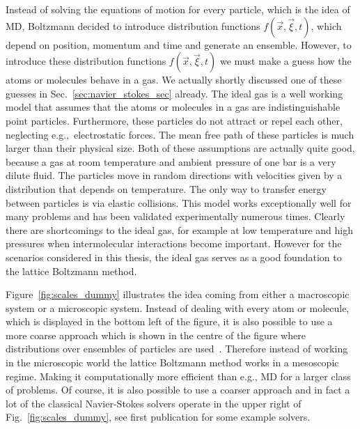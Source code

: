 Instead of solving the equations of motion for every particle, which is the idea of MD, Boltzmann decided to introduce distribution functions $f(\vec{x},\vec{\xi},t)$, which depend on position, momentum and time and generate an ensemble.
However, to introduce these distribution functions $f(\vec{x},\vec{\xi},t)$ we must make a guess how the atoms or molecules behave in a gas.
We actually shortly discussed one of these guesses in Sec.~\ref{sec:navier_stokes_sec} already. 
The ideal gas is a well working model that assumes that the atoms or molecules in a gas are indistinguishable point particles. 
Furthermore, these particles do not attract or repel each other, neglecting e.g.,~electrostatic forces.
The mean free path of these particles is much larger than their physical size.
Both of these assumptions are actually quite good, because a gas at room temperature and ambient pressure of one bar is a very dilute fluid.
The particles move in random directions with velocities given by a distribution that depends on temperature. 
The only way to transfer energy between particles is via elastic collisions.
This model works exceptionally well for many problems and has been validated experimentally numerous times.
Clearly there are shortcomings to the ideal gas, for example at low temperature and high pressures when intermolecular interactions become important.
However for the scenarios considered in this thesis, the ideal gas serves as a good foundation to the lattice Boltzmann method.

Figure~\ref{fig:scales_dummy} illustrates the idea coming from either a macroscopic system or a microscopic system.
Instead of dealing with every atom or molecule, which is displayed in the bottom left of the figure, it is also possible to use a more coarse approach which is shown in the centre of the figure where distributions over ensembles of particles are used~\cite{raabeOverviewLatticeBoltzmann2004}.
Therefore instead of working in the microscopic world the lattice Boltzmann method works in a mesoscopic regime.
Making it computationally more efficient than e.g., MD for a larger class of problems.
Of course, it is also possible to use a coarser approach and in fact a lot of the classical Navier-Stokes solvers operate in the upper right of Fig.~\ref{fig:scales_dummy}, see first publication for some example solvers.

